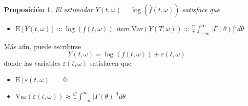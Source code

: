 \documentclass[serif,mathserif,professionalfont]{beamer}
\newtheorem{proposicion}{Proposición}
\newcommand{\intR}{\int_{-\infty}^{\infty}}
\newcommand{\est}[1]{\widehat{ #1 }}
\newcommand{\E}[1]{\mathrm{E}\left[ #1 \right]}
\newcommand{\Var}[1]{\mathrm{Var}\left( #1 \right)}
\newcommand{\Cov}[1]{\mathrm{Cov}\left( #1 \right)}
\newcommand{\abso}[1]{\left| #1 \right|}
\begin{document}
%

\begin{frame}
\begin{proposicion}
El estimador $ Y(t,\omega) = \log{\left( \est{f}(t,\omega)\right)}$ satisface que
\begin{itemize}
\item $\displaystyle 
\E{ Y(t,\omega) } \approx \log \left( f(t,\omega) \right)$
item $\displaystyle 
\Var{ Y(T,\omega) } 
\approx \frac{C}{\tau} \intR \abso{\Gamma (\theta)}^{4} d\theta $
\end{itemize}
\end{proposicion}

M\'as a\'un, puede escribirse
\begin{equation*}
Y(t,\omega) = \log \left( f(t,\omega) \right) + \varepsilon(t,\omega)
\end{equation*}
donde las variables $\varepsilon(t,\omega)$ satisfacen que
\begin{itemize}
\item $\displaystyle \E{\varepsilon(t,\omega)} = 0$
\item $\displaystyle \Var{\varepsilon(t,\omega)}
\approx \frac{C}{\tau} \intR \abso{\Gamma (\theta)}^{4} d\theta$
\end{itemize}
\end{frame}
\end{document}
